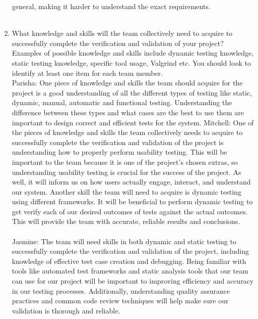 \documentclass[12pt, titlepage]{article}
\begin{document}
\begin{enumerate}
  general, making it harder to understand the exact requirements.\\\\
  \item What knowledge and skills will the team collectively need to acquire to
  successfully complete the verification and validation of your project?
  Examples of possible knowledge and skills include dynamic testing knowledge,
  static testing knowledge, specific tool usage, Valgrind etc.  You should look to
  identify at least one item for each team member.\\
  \newline
  \hspace{2em} Parisha: One piece of knowledge and skills the team should acquire for the project is a good understanding 
  of all the different types of testing like static, dynamic, manual, automatic and functional testing. Understanding the difference
  between these types and what cases are the best to use them are important to design correct and efficient tests for the system.
  \hspace{2em} Mitchell: One of the pieces of knowledge and skills the team collectively needs to acquire to 
  successfully complete the verification and validation of the project is understanding how to properly perform
  usability testing. This will be important to the team because it is one of the project's chosen extras, so understanding
  usability testing is crucial for the success of the project. As well, it will inform us on how users actually engage,
  interact, and understand our system. Another skill the team will need to acquire is dynamic testing using different frameworks.
  It will be beneficial to perform dynamic testing to get verify each of our desired outcomes of tests against the actual outcomes.
  This will provide the team with accurate, reliable results and conclusions.\\\\
  \hspace{2em} Jasmine: The team will need skills in both dynamic and static testing to successfully complete the 
  verification and validation of the project, including knowledge of effective test case creation and debugging. 
  Being familiar with tools like automated test frameworks and static analysis tools that our team can use for our 
  project will be important to improving efficiency and accuracy in our testing processes. Additionally, understanding 
  quality assurance practices and common code review techniques will help make sure our validation is thorough and reliable. \\\\

\end{enumerate}
\end{document}
